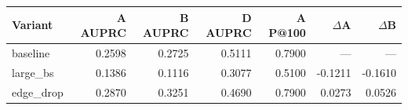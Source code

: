 \begin{tabular}{lrrrrrr}
\toprule
Variant & A AUPRC & B AUPRC & D AUPRC & A P@100 & $\Delta$A & $\Delta$B \\
\midrule
baseline & 0.2598 & 0.2725 & 0.5111 & 0.7900 & — & — \\
large\_bs & 0.1386 & 0.1116 & 0.3077 & 0.5100 & -0.1211 & -0.1610 \\
edge\_drop & 0.2870 & 0.3251 & 0.4690 & 0.7900 & 0.0273 & 0.0526 \\
\bottomrule
\end{tabular}
